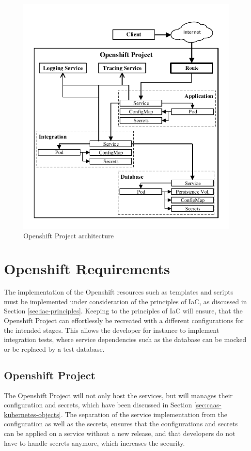 \begin{figure}[htbp]
	\centering
	\includegraphics[scale=1]{images/esboc-design-openshift.pdf}
	\caption{Openshift Project architecture}
	\label{fig:esboc-design-openshift-project}
\end{figure} 

\section{Openshift Requirements}
\label{sec:esboc-requirements-oc}
The implementation of the Openshift resources such as templates and scripts must be implemented under consideration of the principles of IaC, as discussed in Section \vref{sec:iac-principles}. Keeping to the principles of IaC will ensure, that the Openshift Project can effortlessly be recreated with a different configurations for the intended stages. This allows the developer for instance to implement integration tests, where service dependencies such as the database can be mocked or be replaced by a test database.

\subsection{Openshift Project}
\label{sec:esboc-requirements-oc-project}
The Openshift Project will not only host the services, but will manages their configuration and secrets, which have been discussed in Section \vref{sec:caas-kubernetes-objects}. The separation of the service implementation from the configuration as well as the secrets, ensures that the configurations and secrets can be applied on a service without a new release, and that developers do not have to handle secrets anymore, which increases the security.

